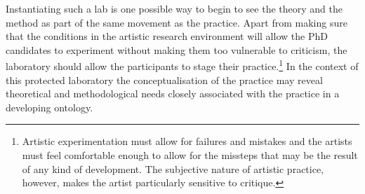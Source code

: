 \documentclass[12pt]{article}
\begin{document}

Instantiating such a lab is one possible way to begin to see the theory and the method as part of the same movement as the practice. Apart from making sure that the conditions in the artistic research environment will allow the PhD candidates to experiment without making them too vulnerable to criticism, the laboratory should allow the participants to stage their practice.\footnote{Artistic experimentation must allow for failures and mistakes and the artists must feel comfortable enough to allow for the missteps that may be the result of any kind of development. The subjective nature of artistic practice, however, makes the artist particularly sensitive to critique.} In the context of this protected laboratory the conceptualisation of the practice may reveal theoretical and methodological needs closely associated with the practice in a developing ontology. 

\end{document}
